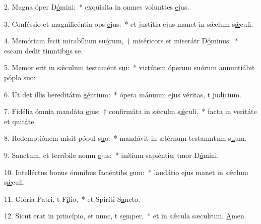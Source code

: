 2. Magna óper D\uline{ó}mini:~* exquisíta in omnes volunttes \uline{e}jus.\par 
3. Conféssio et magnificéntia ops \uline{e}jus:~* et justítia ejus manet in sǽclum s\uline{ǽ}culi.\par 
4. Memóriam fecit mirabílium su\uline{ó}rum,~† miséricors et miserátr D\uline{ó}minus:~* escam dedit timntib\uline{u}s se.\par 
5. Memor erit in sǽculum testamént s\uline{u}i:~* virtútem óperum suórum annuntiábit póplo s\uline{u}o:\par 
6. Ut det illis hereditátm g\uline{é}ntium:~* ópera mánuum ejus véritas, t jud\uline{í}cium.\par 
7. Fidélia ómnia mandáta \uline{e}jus:~† confirmáta in sǽculm s\uline{ǽ}culi,~* facta in veritáte et quit\uline{á}te.\par 
8. Redemptiónem misit pópul s\uline{u}o:~* mandávit in ætérnum testamntum s\uline{u}um.\par 
9. Sanctum, et terríbile nomn \uline{e}jus:~* inítium sapiéntiæ tmor D\uline{ó}mini.\par 
10. Intelléctus bonus ómnibus faciéntibs \uline{e}um:~* laudátio ejus manet in sǽclum s\uline{ǽ}culi.\par 
11. Glória Patri, t F\uline{í}lio,~* et Spiríti S\uline{a}ncto.\par 
12. Sicut erat in princípio, et nunc, t s\uline{e}mper,~* et in sǽcula sæculrum. \uline{A}men.\par 
